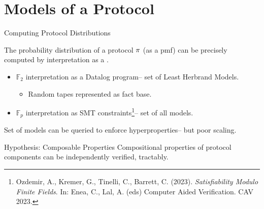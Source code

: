 \documentclass{beamer}
\begin{document}
\section{Models of a Protocol}

\begin{frame}{Computing Protocol Distributions}

  The probability distribution of a protocol $\pi$ (as a pmf) can be precisely computed
  by interpretation as a .
  \begin{itemize}
  \item $\mathbb{F}_2$ interpretation as a Datalog program-- set of Least Herbrand Models.
    \begin{itemize}
      \item Random tapes represented as fact base.
    \end{itemize}
  \item $\mathbb{F}_p$ interpretation as SMT constraints\footnote{Ozdemir, A., Kremer, G., Tinelli, C., Barrett, C. (2023). \emph{Satisfiability Modulo Finite Fields}. In: Enea, C., Lal, A. (eds) Computer Aided Verification. CAV 2023. }-- set of all models.
  \end{itemize}
  Set of models can be queried to enforce hyperproperties-- but poor scaling.

  \begin{alertblock}{Hypothesis: Composable Properties}
    Compositional properties of protocol components can be independently verified, tractably.
  \end{alertblock}
  
\end{frame}
\end{document}
